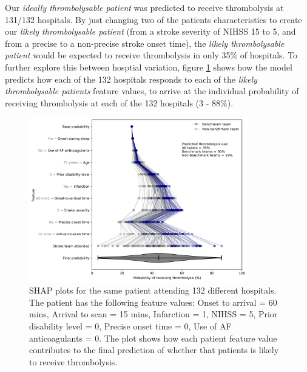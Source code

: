 Our \emph{ideally thrombolysable patient} was predicted to receive thrombolysis at 131/132 hospitals. By just changing two of the patients characteristics to create our \emph{likely thrombolysable patient} (from a stroke severity of NIHSS 15 to 5, and from a precise to a non-precise stroke onset time), the \emph{likely thrombolysable patient} would be expected to receive thrombolysis in only 35\% of hospitals. To further explore this between hosptial variation, figure \ref{fig:results_artifical_shap_waterfall_with_violin} shows how the model predicts how each of the 132 hospitals responds to each of the \emph{likely thrombolysable patients} feature values, to arrive at the individual probability of receiving thrombolysis at each of the 132 hospitals (3 - 88\%).

\begin{figure}[!h]
\centering
\includegraphics[width=0.85\textwidth]{./images/21_shap_waterfall_with_violin_contentious}
\caption{SHAP plots for the same patient attending 132 different hospitals. The patient has the following feature values: Onset to arrival = 60 mins, Arrival to scan = 15 mins, Infarction = 1, NIHSS = 5, Prior disability level = 0, Precise onset time = 0, Use of AF anticoagulants = 0. The plot shows how each patient feature value contributes to the final prediction of whether that patients is likely to receive thrombolysis.}
\label{fig:results_artifical_shap_waterfall_with_violin}
\end{figure}








